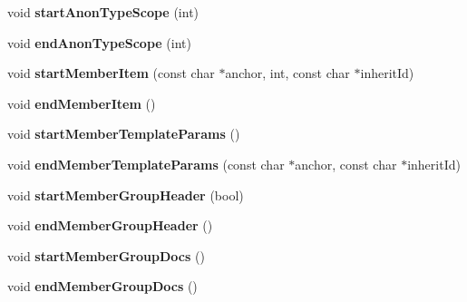 \begin{DoxyCompactItemize}
\item 
\hypertarget{class_html_generator_a5dee2d22c83c4357c0c9e9acbe803d35}{void {\bfseries start\-Anon\-Type\-Scope} (int)}\label{class_html_generator_a5dee2d22c83c4357c0c9e9acbe803d35}

\item 
\hypertarget{class_html_generator_a13707ca1d4a5dfff74ed86d22e0245e5}{void {\bfseries end\-Anon\-Type\-Scope} (int)}\label{class_html_generator_a13707ca1d4a5dfff74ed86d22e0245e5}

\item 
\hypertarget{class_html_generator_a0d558af66619c57425427e369b72b33b}{void {\bfseries start\-Member\-Item} (const char $\ast$anchor, int, const char $\ast$inherit\-Id)}\label{class_html_generator_a0d558af66619c57425427e369b72b33b}

\item 
\hypertarget{class_html_generator_aeca4b74189a714a52d2e5837e453a0d6}{void {\bfseries end\-Member\-Item} ()}\label{class_html_generator_aeca4b74189a714a52d2e5837e453a0d6}

\item 
\hypertarget{class_html_generator_abeb4730c77d34d8a191a957032cd4008}{void {\bfseries start\-Member\-Template\-Params} ()}\label{class_html_generator_abeb4730c77d34d8a191a957032cd4008}

\item 
\hypertarget{class_html_generator_a134f062c16fa5e97c706661cbb1112d0}{void {\bfseries end\-Member\-Template\-Params} (const char $\ast$anchor, const char $\ast$inherit\-Id)}\label{class_html_generator_a134f062c16fa5e97c706661cbb1112d0}

\item 
\hypertarget{class_html_generator_ab9d164d85715527cff385a3d599ccf7b}{void {\bfseries start\-Member\-Group\-Header} (bool)}\label{class_html_generator_ab9d164d85715527cff385a3d599ccf7b}

\item 
\hypertarget{class_html_generator_a7e1a44a13d8b22dc7929a9cdbd94b725}{void {\bfseries end\-Member\-Group\-Header} ()}\label{class_html_generator_a7e1a44a13d8b22dc7929a9cdbd94b725}

\item 
\hypertarget{class_html_generator_aa8c7357f48d452ccd00a331623c4674a}{void {\bfseries start\-Member\-Group\-Docs} ()}\label{class_html_generator_aa8c7357f48d452ccd00a331623c4674a}

\item 
\hypertarget{class_html_generator_a0e63ff5117b5bd3305323117412c6ff1}{void {\bfseries end\-Member\-Group\-Docs} ()}\label{class_html_generator_a0e63ff5117b5bd3305323117412c6ff1}


\end{DoxyCompactItemize}

